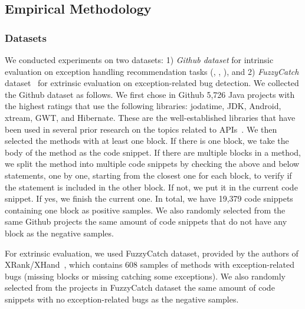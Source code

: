 \subsection{Empirical Methodology}

\subsubsection{Datasets}


We conducted experiments on two datasets: 1) {\em Github dataset}
for intrinsic evaluation on exception handling recommendation tasks
({\xblock}, {\xstate}, {\xtype}), and 2) {\em FuzzyCatch}
dataset~\cite{xrank-fse20} for extrinsic evaluation on
exception-related bug detection.
%
%
We collected the Github dataset as follows. We first chose in Github
5,726 Java projects with the highest ratings that use
the following libraries: jodatime, JDK, Android, xtream, GWT, and
Hibernate. These are the well-established libraries that have been used
in several prior research on the topics related to
APIs~\cite{icse18,liveapi14}. We then selected the methods with at
least one  block. If there is one 
block, we take the body of the method as the code
snippet. If there are multiple  blocks in a method, we
split the method into multiple code snippets by checking the above and
below statements, one by one, starting from the closest one for each
 block, to verify if the statement is included in the
other block. If not, we put it in the current code snippet. If yes, we
finish the current one. In total, we have
19,379 code snippets containing one
 block as positive samples. We also randomly selected
from the same Github projects the same amount of code snippets that do
not have any  block as the negative samples.

For extrinsic evaluation, we used FuzzyCatch dataset, provided by the
authors of XRank/XHand~\cite{xrank-fse20}, which contains 608 samples
of methods with exception-related bugs (missing 
blocks or missing catching some exceptions).  We also randomly
selected from the projects in FuzzyCatch dataset the same amount of
code snippets with no exception-related bugs as the negative samples.


